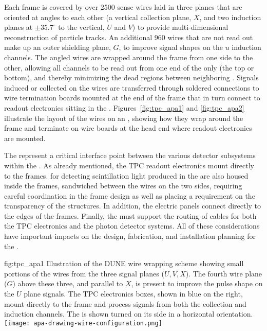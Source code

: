 Each  frame is covered by over \num{2500} sense wires laid in three planes that are oriented at angles to each other (a vertical collection plane, $X$, and two induction planes at $\pm35.7^\circ$ to the vertical, $U$ and $V$) to provide multi-dimensional reconstruction of particle tracks.  An additional \num{960} wires that are not read out make up an outer shielding plane, $G$, to improve signal shapes on the $u$ induction channels.  The angled wires are wrapped around the frame from one side to the other, allowing all channels to be read out from one end of the  only (the top or bottom), and thereby minimizing the dead regions between neighboring . Signals induced or collected on the wires are transferred through soldered connections to wire termination boards mounted at the end of the  frame that in turn connect to  readout electronics sitting in the \lar.  Figures~\ref{fig:tpc_apa1} and \ref{fig:tpc_apa2} illustrate the layout of the wires on an , showing how they wrap around the frame and terminate on wire boards at the head end where readout electronics are mounted.

The  represent a critical interface point between the various detector subsystems within the .  As already mentioned, the TPC readout electronics mount directly to the  frames.   for detecting scintillation light produced in the \lar are also housed inside the frames, sandwiched between the wires on the two sides, requiring careful coordination in the frame design as well as placing a requirement on the transparency of the  structures.  In addition, the electric  panels connect directly to the edges of the  frames.  Finally, the  must support the routing of cables for both the TPC electronics and the photon detector systems. All of these considerations have important impacts on the design, fabrication, and installation planning for the .   

\begin{dunefigure}{fig:tpc_apa1}
{Illustration of the DUNE  wire wrapping scheme showing small portions of the wires from the three signal planes ($U,V,X$). The fourth wire plane ($G$) above these three, and parallel to $X$, is present to improve the pulse shape on the $U$ plane signals. The TPC electronics boxes, shown in blue on the right, mount directly to the frame and process signals from both the collection and induction channels. The  is shown turned on its side in a horizontal orientation.} 
\texttt{[image: apa-drawing-wire-configuration.png]} 
\end{dunefigure} 


